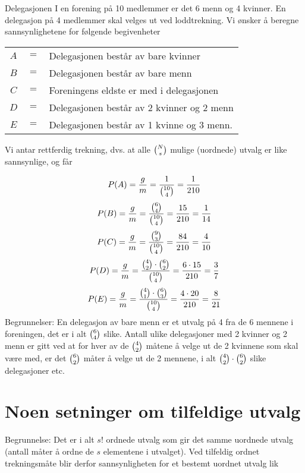 \begin{eksempel}{Delegasjonen}
I en forening på 10 medlemmer er det 6 menn og 4 kvinner. En
delegasjon på 4 medlemmer skal velges ut ved loddtrekning. Vi
ønsker å beregne sannsynlighetene for følgende begivenheter
\begin{center}
\begin{tabular}{ccl}
    $ A $&$=$& Delegasjonen består av bare kvinner \\
    $ B $&$=$& Delegasjonen består av bare menn \\
    $ C $&$=$& Foreningens eldste er med i delegasjonen \\
    $ D $&$=$& Delegasjonen består av 2 kvinner og 2 menn \\
    $ E $&$=$& Delegasjonen består av 1 kvinne og 3 menn.
\end{tabular}
\end{center}
Vi antar rettferdig trekning, dvs. at alle   ${{N}\choose{s}}$   mulige
(uordnede) utvalg er like sannsynlige, og får 

\[ P(A)=\frac{g}{m}= \frac{1}{{{10}\choose{4}}}=\frac{1}{210} \]
\[ P(B)=\frac{g}{m}= \frac{{{6}\choose{4}}}{{{10}\choose{4}}}=\frac{15}{210}=
                                 \frac{1}{14} \]
\[ P(C)=\frac{g}{m}= \frac{{{9}\choose{3}}}{{{10}\choose{4}}}=\frac{84}{210}=
                                 \frac{4}{10} \]
\[ P(D)=\frac{g}{m}= \frac{{{4}\choose{2}}\cdot {{6}\choose{2}}}{{{10}\choose{4}}}=
                     \frac{6 \cdot 15}{210}=\frac{3}{7} \]
\[ P(E)=\frac{g}{m}= \frac{{{4}\choose{1}}\cdot {{6}\choose{3}}}{{{10}\choose{4}}}=
                   \frac{4 \cdot 20}{210}=\frac{8}{21} \]
\noindent Begrunnelser: En delegasjon av bare menn er et utvalg på 4 fra de
6 mennene i foreningen, det er i alt ${{6}\choose{4}}$ slike. Antall ulike
delegasjoner med 2 kvinner og 2 menn er gitt ved at for hver av
de ${{4}\choose{2}}$ måtene å velge ut de 2 kvinnene som skal være med,
er det ${{6}\choose{2}}$ måter å velge ut de 2 mennene, i alt
${{4}\choose{2}}\cdot {{6}\choose{2}}$ slike delegasjoner etc.
\end{eksempel}

\section{ Noen setninger om tilfeldige utvalg}

\begin{center}  \end{center}
\noindent Begrunnelse: Det er i alt $s$! ordnede utvalg som gir det samme
uordnede utvalg (antall måter å ordne de $s$ elementene i
utvalget). Ved tilfeldig ordnet trekningsmåte blir derfor
sannsynligheten for et bestemt uordnet utvalg lik

